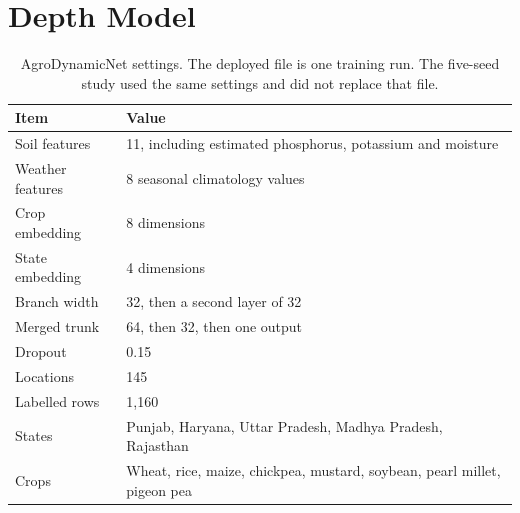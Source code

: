 \section{Depth Model}
\begin{table}[H]
\centering
\caption{AgroDynamicNet settings. The deployed file is one training run. The five-seed study used the same settings and did not replace that file.}
\label{tab:nn-settings}
\begin{tabular}{lp{}}
\toprule
\textbf{Item} & \textbf{Value} \\
\midrule
Soil features & 11, including estimated phosphorus, potassium and moisture \\
Weather features & 8 seasonal climatology values \\
Crop embedding & 8 dimensions \\
State embedding & 4 dimensions \\
Branch width & 32, then a second layer of 32 \\
Merged trunk & 64, then 32, then one output \\
Dropout & 0.15 \\
Locations & 145 \\
Labelled rows & 1{,}160 \\
States & Punjab, Haryana, Uttar Pradesh, Madhya Pradesh, Rajasthan \\
Crops & Wheat, rice, maize, chickpea, mustard, soybean, pearl millet, pigeon pea \\
\bottomrule
\end{tabular}
\end{table}

